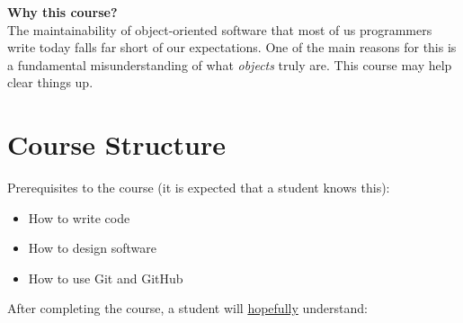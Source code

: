 \documentclass[nobrand,anonymous,nodate,nosecurity]{huawei}
\begin{document}
\textbf{Why this course?}\\
The maintainability of object-oriented software that most of us programmers write today falls far short of our expectations.
One of the main reasons for this is a fundamental misunderstanding of what \emph{objects} truly are.
This course may help clear things up.


\newpage
\section*{Course Structure}

Prerequisites to the course (it is expected that a student knows this):

\begin{itemize}
\item How to write code
\item How to design software
\item How to use Git and GitHub
\end{itemize}

After completing the course, a student will \ul{hopefully} understand:
\end{document}
